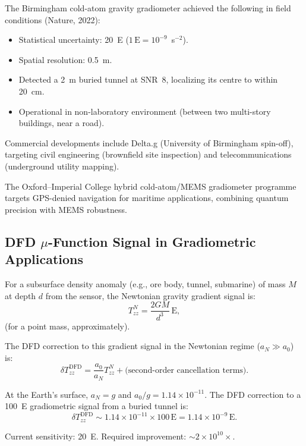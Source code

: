 \documentclass[11pt]{article}
\theoremstyle{definition}
\theoremstyle{remark}
\newcommand{\ee}[1]{\times10^{#1}}
\newcommand{\azero}{a_0}
\begin{document}
The Birmingham cold-atom gravity gradiometer achieved the following
in field conditions (Nature, 2022):

\begin{itemize}[nosep]
\item Statistical uncertainty: 20~E ($1\,\mathrm{E} = 10^{-9}$~s$^{-2}$).
\item Spatial resolution: 0.5~m.
\item Detected a 2~m buried tunnel at SNR~8, localizing its centre
  to within 20~cm.
\item Operational in non-laboratory environment (between two
  multi-story buildings, near a road).
\end{itemize}

Commercial developments include Delta.g (University of Birmingham
spin-off), targeting civil engineering (brownfield site inspection)
and telecommunications (underground utility mapping).

The Oxford--Imperial College hybrid cold-atom/MEMS gradiometer
programme targets GPS-denied navigation for maritime applications,
combining quantum precision with MEMS robustness.

\subsection{DFD $\mu$-Function Signal in Gradiometric Applications}

For a subsurface density anomaly (e.g., ore body, tunnel, submarine)
of mass $M$ at depth $d$ from the sensor, the Newtonian gravity
gradient signal is:
\begin{equation}
T_{zz}^N = \frac{2GM}{d^3}\,\mathrm{E},
\end{equation}
(for a point mass, approximately).

The DFD correction to this gradient signal in the Newtonian regime
($a_N \gg \azero$) is:
\begin{equation}
\delta T_{zz}^{\mathrm{DFD}} = \frac{\azero}{a_N} T_{zz}^N
+ \text{(second-order cancellation terms)}.
\end{equation}

At the Earth's surface, $a_N = g$ and $\azero/g = 1.14\ee{-11}$.
The DFD correction to a 100~E gradiometric signal from a buried
tunnel is:
\begin{equation}
\delta T_{zz}^{\mathrm{DFD}} \sim 1.14\ee{-11} \times 100\,\mathrm{E}
= 1.14\ee{-9}\,\mathrm{E}.
\end{equation}

Current sensitivity: 20~E. Required improvement: $\sim 2\ee{10}\times$.
\end{document}
